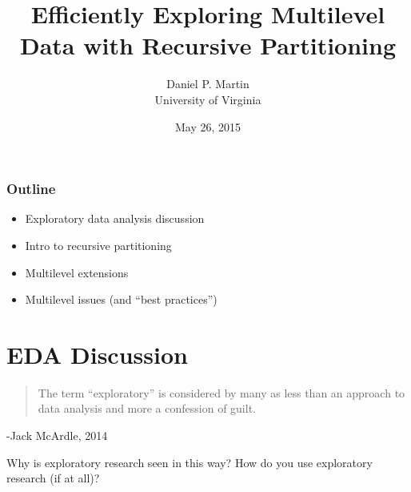 \documentclass{beamer}\usepackage[]{graphicx}\usepackage[]{color}
\title{Efficiently Exploring Multilevel Data with Recursive Partitioning}
\author[Daniel P. Martin]{
Daniel P. Martin\\
University of Virginia\\
}
\institute[\textbf{\insertframenumber \hspace{0.1 cm}of \inserttotalframenumber}]
\date{May 26, 2015}
\begin{document}




\begin{frame}

\titlepage

\end{frame}


\begin{frame}
\frametitle{Outline}

\begin{itemize}
\item Exploratory data analysis discussion
\item Intro to recursive partitioning
\item Multilevel extensions
\item Multilevel issues (and ``best practices'')
\end{itemize}

\end{frame}


\section{EDA Discussion}
\begin{frame}

\begin{quote}
    The term ``exploratory'' is considered by many as less than an approach to data analysis and more a confession of guilt.
\end{quote}

\hspace{6ex} -Jack McArdle, 2014

\pause

\vspace{5ex}

Why is exploratory research seen in this way? How do you use exploratory research (if at all)?

\end{frame}

\end{document}
